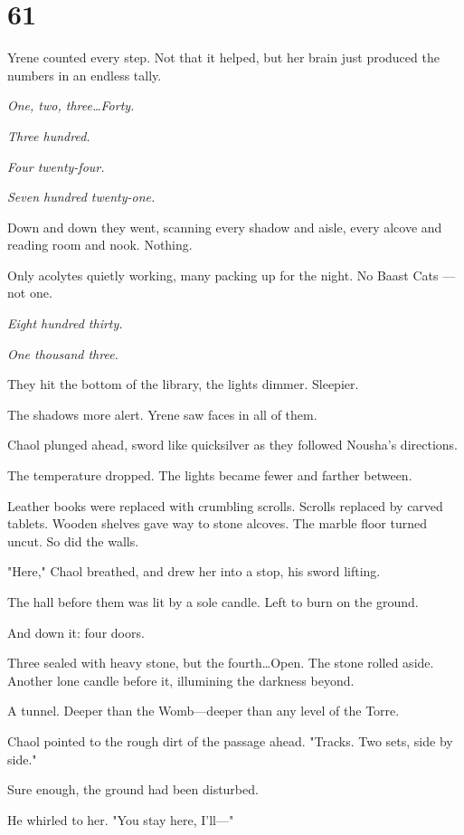 
\chapter{61}

Yrene counted every step.
Not that it helped, but her brain just produced the numbers in an endless tally.

\emph{One, two, three\ldots Forty.}

\emph{Three hundred.}

\emph{Four twenty-four.}

\emph{Seven hundred twenty-one.}

Down and down they went, scanning every shadow and aisle, every alcove and reading room and nook.
Nothing.

Only acolytes quietly working, many packing up for the night.
No Baast Cats ---not one.

\emph{Eight hundred thirty.}

\emph{One thousand three.}

They hit the bottom of the library, the lights dimmer.
Sleepier.

The shadows more alert.
Yrene saw faces in all of them.

Chaol plunged ahead, sword like quicksilver as they followed Nousha's directions.

The temperature dropped.
The lights became fewer and farther between.

Leather books were replaced with crumbling scrolls.
Scrolls replaced by carved tablets.
Wooden shelves gave way to stone alcoves.
The marble floor turned uncut.
So did the walls.

"Here," Chaol breathed, and drew her into a stop, his sword lifting.

The hall before them was lit by a sole candle.
Left to burn on the ground.

And down it: four doors.

Three sealed with heavy stone, but the fourth\ldots Open.
The stone rolled aside.
Another lone candle before it, illumining the darkness beyond.

A tunnel.
Deeper than the Womb---deeper than any level of the Torre.

Chaol pointed to the rough dirt of the passage ahead.
"Tracks.
Two sets, side by side."

Sure enough, the ground had been disturbed.

He whirled to her.
"You stay here, I'll---"


